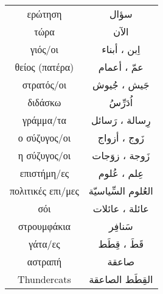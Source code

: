 \documentclass[twocolumn,a4paper]{article}
\newcommand{\ar}[1]{\textarabic{#1}}
\begin{document}
\begin{supertabular}{ c c }
ερώτηση        & \ar{ سؤال } \\
τώρα           & \ar{ اﻵن } \\
γιός/οι        & \ar{ اِبن ، أبناء } \\
θείος (πατέρα) & \ar{ عمّ ، أعمام } \\
στρατός/οι     & \ar{ جَيش ، جُيوش } \\
διδάσκω        & \ar{ اُدَرِّسُ } \\
γράμμα/τα      & \ar{ رِسالة ، رَسائل } \\
ο σύζυγος/οι   & \ar{ زَوج ، أزواج } \\
η σύζυγος/οι   & \ar{ زَوجة ، زوَجات } \\
επιστήμη/ες    & \ar{ عِلم ، عُلوم } \\
πολιτικές επι/μες & \ar{ العُلوم السِّياسيّة } \\
σόι            & \ar{ عائلة ، عائلات  } \\
στρουμφάκια    & \ar{ سَنافِر } \\
γάτα/ες        & \ar{ قَطَ ، قِطَط } \\
αστραπή        & \ar{ صاعقة } \\
Τhundercats   & \ar{ القِطَط الصاعقة } \\


\end{supertabular}


\clearpage
\end{document}
